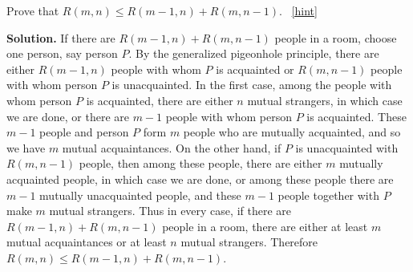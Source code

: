 \documentclass{book}
\begin{document}
\setcounter{project}{52}
\addtocounter{project}{-1}
\begin{activity}[]\label{Ramseyrecurrence}
\hypertarget{p-447}{}%
Prove that \(R(m,n)\le R(m-1,n) + R(m,n-1)\).%
~\hfill{\tiny\hyperlink{a-52}{[hint]}\hypertarget{q-52}{}}\par\smallskip%
\noindent\textbf{Solution.}\hypertarget{solution-49}{}\quad%
\hypertarget{p-449}{}%
If there are \(R(m-1,n) +R(m,n-1)\) people in a room, choose one person, say person \(P\). By the generalized pigeonhole principle, there are either \(R(m-1,n)\) people with whom \(P\) is acquainted or \(R(m,n-1)\) people with whom person \(P\) is unacquainted. In the first case, among the people with whom person \(P\) is acquainted, there are either \(n\) mutual strangers, in which case we are done, or there are \(m-1\) people with whom person \(P\) is acquainted. These \(m-1\) people and person \(P\) form \(m\) people who are mutually acquainted, and so we have \(m\) mutual acquaintances. On the other hand, if \(P\) is unacquainted with \(R(m,n-1)\) people, then among these people, there are either \(m\) mutually acquainted people, in which case we are done, or among these people there are \(m-1\) mutually unacquainted people, and these \(m-1\) people together with \(P\) make \(m\) mutual strangers. Thus in every case, if there are \(R(m-1,n)+R(m,n-1)\) people in a room, there are either at least \(m\) mutual acquaintances or at least \(n\) mutual strangers. Therefore \(R(m,n)\le R(m-1,n)+R(m,n-1)\).%
\end{activity}
\end{document}
